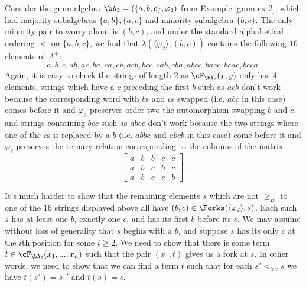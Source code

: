 \begin{ex} Consider the gmm algebra $\bA_2 = (\{a,b,c\},\varphi_2)$ from Example \ref{gmm-ex-2}, which had majority subalgebras $\{a,b\}, \{a,c\}$ and minority subalgebra $\{b,c\}$. The only minority pair to worry about is $(b,c)$, and under the standard alphabetical ordering $<$ on $\{a,b,c\}$, we find that $\lambda(\langle \varphi_2 \rangle, (b,c))$ contains the following $16$ elements of $A^+$:
\[
a, b, c, ab, ac, ba, ca, cb, acb, bcc, cab, cba, abcc, bacc, bcac, bcca.
\]
Again, it is easy to check the strings of length $2$ as $\cF_{\bA_2}(x,y)$ only has $4$ elements, strings which have a $c$ preceding the first $b$ such as $acb$ don't work because the corresponding word with $b$s and $c$s swapped (i.e. $abc$ in this case) comes before it and $\varphi_2$ preserves order two the automorphism swapping $b$ and $c$, and strings containing $bcc$ such as $abcc$ don't work because the two strings where one of the $c$s is replaced by a $b$ (i.e. $abbc$ and $abcb$ in this case) come before it and $\varphi_2$ preserves the ternary relation corresponding to the columns of the matrix
\[
\begin{bmatrix} a & b & b & c & c\\ a & b & c & b & c\\ a & b & c & c & b\end{bmatrix}.
\]

It's much harder to show that the remaining elements $s$ which are not $\ge_E$ to one of the $16$ strings displayed above all have $(b,c) \in \Forks(\langle \varphi_2 \rangle, s)$. Each such $s$ has at least one $b$, exactly one $c$, and has its first $b$ before its $c$. We may assume without loss of generality that $s$ begins with a $b$, and suppose $s$ has its only $c$ at the $i$th position for some $i \ge 2$. We need to show that there is some term $t \in \cF_{\bA_2}(x_1, ..., x_n)$ such that the pair $(x_1, t)$ gives us a fork at $s$. In other words, we need to show that we can find a term $t$ such that for each $s' <_{lex} s$ we have $t(s') = s_1'$ and $t(s) = c$.


\end{ex}
